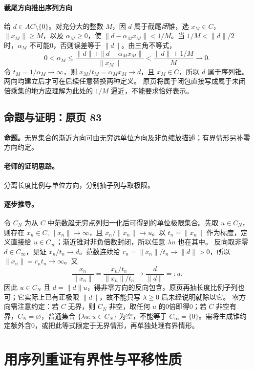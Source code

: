 \documentclass[11pt,a4paper]{article}
\theoremstyle{definition}\newtheorem{definition}{定义}\newtheorem{example}{例}
\begin{document}
\paragraph{截尾方向推出序列方向}
给 $d\in AC\setminus\{0\}$。对充分大的整数 $M$，因 $d$ 属于截尾\emph{闭}锥，选 $x_M\in C$，$\|x_M\|\ge M$，以及 $\alpha_M\ge0$，使 $\|d-\alpha_Mx_M\|<1/M$。当 $1/M<\|d\|/2$ 时，$\alpha_M$ 不可能0，否则误差等于 $\|d\|$。由三角不等式，
\[0<\alpha_M\le\frac{\|d\|+\|d-\alpha_Mx_M\|}{\|x_M\|}<\frac{\|d\|+1/M}{M}\to0.\]
令 $t_M=1/\alpha_M\to\infty$，则 $x_M/t_M=\alpha_Mx_M\to d$，且 $x_M\in C$，所以 $d$ 属于序列锥。两向均建立后才可在后续任意替换两种定义。
原页将属于闭包直接写成属于未闭倍乘集的地方应理解为此处的 $1/M$ 逼近，不能要求恰好表示。


\subsection{命题与证明：原页 83}

\textbf{命题。}无界集合的渐近方向可由无穷远单位方向及非负缩放描述；有界情形另补零方向约定。

\paragraph{老师的证明思路。}分离长度比例与单位方向，分别抽子列与取极限。

\paragraph{逐步推导。}
令 $C_N$ 为从 $C$ 中范数趋无穷点列归一化后可得到的单位极限集合。先取 $u\in C_N$，则存在 $x_n\in C,\|x_n\|\to\infty$，且 $x_n/\|x_n\|\to u$。以 $t_n=\|x_n\|$ 作为标度，定义直接给 $u\in C_\infty$；渐近锥对非负倍数封闭，所以任意 $\lambda u$ 也在其中。
反向取非零 $d\in C_\infty$，见证 $x_n/t_n\to d$。范数连续给 $r_n=\|x_n\|/t_n\to\|d\|>0$，所以 $\|x_n\|=r_nt_n\to\infty$。又
\[\frac{x_n}{\|x_n\|}=\frac{x_n/t_n}{\|x_n\|/t_n}\longrightarrow\frac d{\|d\|}=:u.\]
因此 $u\in C_N$ 且 $d=\|d\|u$，得非零方向的反向包含。原页再抽长度比例子列也可；它实际上已有正极限 $\|d\|$，故不能只写 $\lambda\ge0$ 后未经说明就除以它。
零方向需注意约定：若 $C$ 无界，则 $C_N$ 非空，取任何 $u$ 的0倍即得0；若 $C$ 非空有界，$C_N=\varnothing$，普通集合 $\{\lambda u:u\in C_N\}$ 为空，不能等于 $C_\infty=\{0\}$。需将生成锥约定额外含0，或把此等式限定于无界情形，再单独处理有界情形。


\clearpage\section{用序列重证有界性与平移性质}\label{g:109:84}
\end{document}
